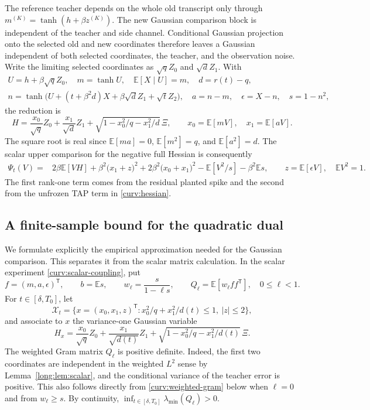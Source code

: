 \documentclass[11pt,reqno]{amsart}
\begin{document}
The reference teacher depends on the whole old transcript only through
$m^{(K)}=\tanh(h+\beta z^{(K)})$. The new Gaussian comparison block is
independent of the teacher and side channel. Conditional Gaussian
projection onto the selected old and new coordinates therefore leaves
a Gaussian independent of both selected coordinates, the teacher, and
the observation noise. Write the limiting selected coordinates as
$\sqrt q Z_0$ and $\sqrt d Z_1$. With
\begin{equation}\label{curv:scalar-coupling}
 \begin{gathered}
 U=h+\beta\sqrt q Z_0,\quad m=\tanh U,\quad
       \mathbb E[X\mid U]=m,\quad d=r(t)-q,\\
 n=\tanh\bigl(U+(t+\beta^2d)X
                       +\beta\sqrt d Z_1+\sqrt t Z_2\bigr),\quad
 a=n-m,\quad \epsilon=X-n,\quad s=1-n^2,
 \end{gathered}
\end{equation}
the reduction is
\[
 H=\frac{x_0}{\sqrt q}Z_0+\frac{x_1}{\sqrt d}Z_1
             +\sqrt{1-x_0^2/q-x_1^2/d}\,\Xi,
 \qquad x_0=\mathbb E[mV],\quad x_1=\mathbb E[aV].
\]
The square root is real since $\mathbb E[ma]=0$,
$\mathbb E[m^2]=q$, and $\mathbb E[a^2]=d$.
The scalar upper comparison for the negative full Hessian is consequently
\begin{align}
 \Psi_t(V)={}&2\beta\mathbb E[VH]
       +\beta^2\bigl(x_1+z\bigr)^2
       +2\beta^2\bigl(x_0+x_1\bigr)^2
       -\mathbb E[V^2/s]-\beta^2\mathbb E s,
 \qquad z=\mathbb E[\epsilon V],\quad \mathbb EV^2=1.
 \label{curv:scalar-comparison}
\end{align}
The first rank-one term comes from the residual planted spike and the
second from the unfrozen TAP term in \eqref{curv:hessian}.

\subsection{A finite-sample bound for the quadratic dual}
\label{curv:finite-dual}

We formulate explicitly the empirical approximation needed for the
Gaussian comparison. This separates it from the scalar matrix
calculation. In the scalar experiment \eqref{curv:scalar-coupling}, put
\[
 f=(m,a,\epsilon)^{\mathsf T},\qquad b=\mathbb E s,
 \qquad w_\ell=\frac{s}{1-\ell s},\qquad
 Q_\ell=\mathbb E[w_\ell ff^{\mathsf T}],\quad 0\le\ell<1.
\]
For $t\in[\delta,T_0]$, let
\[
 \mathcal X_t=
 \bigl\{x=(x_0,x_1,z)^{\mathsf T}:
             x_0^2/q+x_1^2/d(t)\le1,\ |z|\le2\bigr\},
\]
and associate to $x$ the variance-one Gaussian variable
\[
 H_x=\frac{x_0}{\sqrt q}Z_0+\frac{x_1}{\sqrt{d(t)}}Z_1
       +\sqrt{1-x_0^2/q-x_1^2/d(t)}\,\Xi.
\]
The weighted Gram matrix $Q_\ell$ is positive definite. Indeed, the
first two coordinates are independent in the weighted $L^2$ sense by
Lemma~\ref{long:lem:scalar}, and the conditional variance of the teacher
error is positive. This also follows directly from
\eqref{curv:weighted-gram} below when $\ell=0$ and from $w_\ell\ge s$.
By continuity, $\inf_{t\in[\delta,T_0]}\lambda_{\min}(Q_\ell)>0$.
\end{document}
